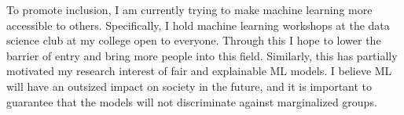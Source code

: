 \documentclass[12pt]{article}
\begin{document}


To promote inclusion, I am currently trying to make machine learning more accessible to others. Specifically, I hold machine learning workshops at the data science club at my college open to everyone. Through this I hope to lower the barrier of entry and bring more people into this field. Similarly, this has partially motivated my research interest of fair and explainable ML models. I believe ML will have an outsized impact on society in the future, and it is important to guarantee that the models will not discriminate against marginalized groups.
\end{document}
